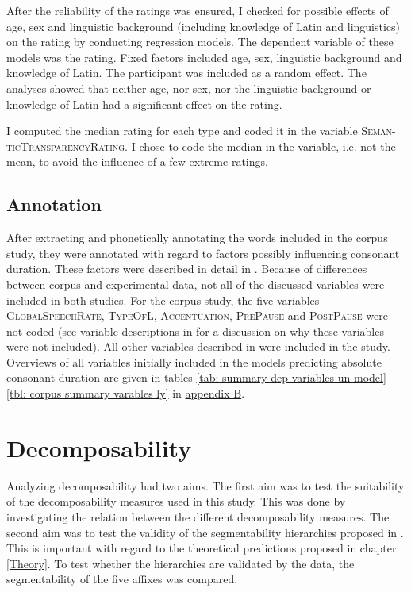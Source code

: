 After the reliability of the ratings was ensured, I checked for possible effects of age, sex and linguistic background (including knowledge of Latin and linguistics) on the rating by conducting regression models. The dependent variable of these models was the rating. Fixed factors included age, sex, linguistic background and knowledge of Latin. The participant was included as a random effect. The analyses showed that neither age, nor sex,  nor the linguistic background or knowledge of Latin had a significant effect on the rating.

I computed the median rating for each type and coded it in the variable \textsc{Seman-ticTransparencyRating}. I chose to code the median in the variable, i.e. not the mean, to avoid the influence of a few extreme ratings. 






\subsection{Annotation} \label{Overview of the Variables in the Data Set corpus}

After extracting and phonetically annotating the words included in the corpus study, they were annotated with regard to factors possibly influencing consonant duration. These factors were described in detail in . Because of differences between corpus and experimental data, not all of the discussed variables were included in both studies. For the corpus study, the five variables \textsc{GlobalSpeechRate}, \textsc{TypeOfL}, \textsc{Accentuation}, \textsc{PrePause} and \textsc{PostPause} were not coded (see variable descriptions in  for a discussion on why these variables were not included). 
All other variables described in  were included in the study. 
Overviews of all variables initially included in the models predicting absolute consonant duration are given in tables \ref{tab: summary dep variables un-model} -- \ref{tbl: corpus summary varables ly} in \hyperref[App B: Summaries of variables in initial models of corpus study]{appendix B}. 




\section{Decomposability} \label{corpus dec}

Analyzing decomposability had two aims. The first aim was to test the suitability of the decomposability measures used in this study. This was done by investigating the relation between the different decomposability measures.  
The second aim was to test the validity of the segmentability hierarchies proposed in .  This is important with regard to the theoretical predictions proposed in chapter \ref{Theory}. To test whether the hierarchies are validated by the data, the segmentability of the five affixes was compared.




